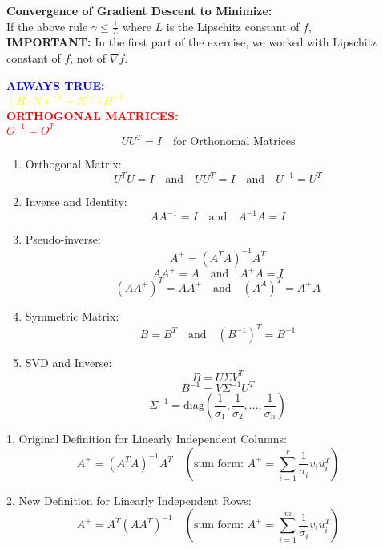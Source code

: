 \documentclass{article}
\begin{document}
\textbf{Convergence of Gradient Descent to Minimize:} \\
If the above rule $\gamma \leq \frac{1}{L}$ where $L$ is the Lipschitz constant of $f$, \\
\textbf{IMPORTANT:} In the first part of the exercise, we worked with Lipschitz constant of $f$, not of $\nabla f$.









\noindent\textcolor{blue}{\textbf{ALWAYS TRUE:}}\\
\textcolor{yellow}{\((H \cdot N)^{-1} = N^{-1} \cdot H^{-1}\)}\\

\vspace{1em}
\noindent\textcolor{red}{\textbf{ORTHOGONAL MATRICES:}}\\
\textcolor{red}{\(O^{-1} = O^{T}\)}\\

\vspace{1em}
\[
UU^{T} = I \quad \text{for Orthonomal Matrices}
\]




\begin{enumerate}
    \item Orthogonal Matrix:
    \[
    U^TU = I \quad \text{and} \quad UU^T = I \quad \text{and} \quad U^{-1} = U^T
    \]
    \item Inverse and Identity:
    \[
    AA^{-1} = I \quad \text{and} \quad A^{-1}A = I
    \]
    \item Pseudo-inverse:
    \[
    A^+ = (A^TA)^{-1}A^T
    \]
    \[
    AA^+ = A \quad \text{and} \quad A^+A = I
    \]
    \[
    (AA^+)^T = AA^+ \quad \text{and} \quad (A^A)^T = A^+A
    \]
    \item Symmetric Matrix:
    \[
    B = B^T \quad \text{and} \quad (B^{-1})^T = B^{-1}
    \]
    \item SVD and Inverse:
    \[
    B = U\Sigma V^T
    \]
    \[
    B^{-1} = V\Sigma^{-1}U^T
    \]
    \[
    \Sigma^{-1} = \text{diag}\left(\frac{1}{\sigma_1}, \frac{1}{\sigma_2}, \ldots, \frac{1}{\sigma_n}\right)
    \]
\end{enumerate}







1. Original Definition for Linearly Independent Columns:
\[
A^+ = (A^TA)^{-1}A^T \quad (\text{sum form: } A^+ = \sum_{i=1}^{r} \frac{1}{\sigma_i} v_i u_i^T)
\]

2. New Definition for Linearly Independent Rows:
\[
A^+ = A^T (AA^T)^{-1} \quad (\text{sum form: } A^+ = \sum_{i=1}^{m} \frac{1}{\sigma_i} v_i u_i^T)
\]




    
\end{document}
